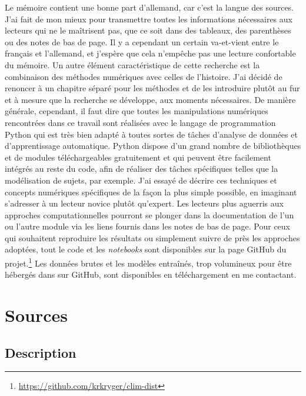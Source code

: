 \documentclass[a4paper,twoside,12pt]{article}
\begin{document}
Le mémoire contient une bonne part d'allemand, car c'est la langue des sources. J'ai fait de mon mieux pour transmettre toutes les informations nécessaires aux lecteurs qui ne le maîtrisent pas, que ce soit dans des tableaux, des parenthèses ou des notes de bas de page. Il y a cependant un certain va-et-vient entre le français et l'allemand, et j'espère que cela n'empêche pas une lecture confortable du mémoire. Un autre élément caractéristique de cette recherche est la combinaison des méthodes numériques avec celles de l'histoire. J'ai décidé de renoncer à un chapitre séparé pour les méthodes et de les introduire plutôt au fur et à mesure que la recherche se développe, aux moments nécessaires. De manière générale, cependant, il faut dire que toutes les manipulations numériques rencontrées dans ce travail sont réalisées avec le langage de programmation Python qui est très bien adapté à toutes sortes de tâches d'analyse de données et d'apprentissage automatique. Python dispose d'un grand nombre de bibliothèques et de modules téléchargeables gratuitement et qui peuvent être facilement intégrés au reste du code, afin de réaliser des tâches spécifiques telles que la modélisation de sujets, par exemple. J'ai essayé de décrire ces techniques et concepts numériques spécifiques de la façon la plus simple possible, en imaginant s'adresser à un lecteur novice plutôt qu'expert. Les lecteurs plus aguerris aux approches computationnelles pourront se plonger dans la documentation de l'un ou l'autre module via les liens fournis dans les notes de bas de page. Pour ceux qui souhaitent reproduire les résultats ou simplement suivre de près les approches adoptées, tout le code et les \textit{notebooks} sont disponibles sur la page GitHub du projet.\footnote{\url{https://github.com/krkryger/clim-dist}} Les données brutes et les modèles entraînés, trop volumineux pour être hébergés dans sur GitHub, sont disponibles en téléchargement en me contactant.

\clearpage



\section{Sources} \label{sources}

\subsection{Description} \label{description_corpus}

\end{document}

